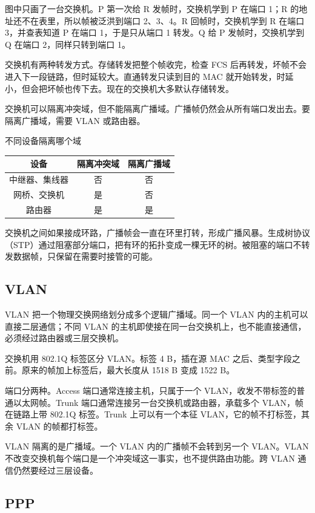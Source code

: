 图中只画了一台交换机。P 第一次给 R 发帧时，交换机学到 P 在端口 1；R 的地址还不在表里，所以帧被泛洪到端口 2、3、4。R 回帧时，交换机学到 R 在端口 3，并查表知道 P 在端口 1，于是只从端口 1 转发。Q 给 P 发帧时，交换机学到 Q 在端口 2，同样只转到端口 1。

交换机有两种转发方式。存储转发把整个帧收完，检查 FCS 后再转发，坏帧不会进入下一段链路，但时延较大。直通转发只读到目的 MAC 就开始转发，时延小，但会把坏帧也传下去。现在的交换机大多默认存储转发。

交换机可以隔离冲突域，但不能隔离广播域。广播帧仍然会从所有端口发出去。要隔离广播域，需要 VLAN 或路由器。

\begin{tablebox}{不同设备隔离哪个域}
\centering
\begin{tabular}{|c|c|c|}
\hline
设备 & 隔离冲突域 & 隔离广播域 \\
\hline
中继器、集线器 & 否 & 否 \\
网桥、交换机 & 是 & 否 \\
路由器 & 是 & 是 \\
\hline
\end{tabular}
\end{tablebox}

交换机之间如果接成环路，广播帧会一直在环里打转，形成广播风暴。生成树协议（STP）通过阻塞部分端口，把有环的拓扑变成一棵无环的树。被阻塞的端口不转发数据帧，只保留在需要时接管的可能。

\subsection{VLAN}

VLAN 把一个物理交换网络划分成多个逻辑广播域。同一个 VLAN 内的主机可以直接二层通信；不同 VLAN 的主机即使接在同一台交换机上，也不能直接通信，必须经过路由器或三层交换机。

交换机用 802.1Q 标签区分 VLAN。标签 4 B，插在源 MAC 之后、类型字段之前。原来的帧加上标签后，最大长度从 1518 B 变成 1522 B。

端口分两种。Access 端口通常连接主机，只属于一个 VLAN，收发不带标签的普通以太网帧。Trunk 端口通常连接另一台交换机或路由器，承载多个 VLAN，帧在链路上带 802.1Q 标签。Trunk 上可以有一个本征 VLAN，它的帧不打标签，其余 VLAN 的帧都打标签。

VLAN 隔离的是广播域。一个 VLAN 内的广播帧不会转到另一个 VLAN。VLAN 不改变交换机每个端口是一个冲突域这一事实，也不提供路由功能。跨 VLAN 通信仍然要经过三层设备。

\subsection{PPP}

